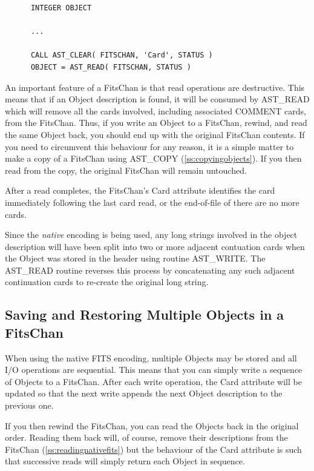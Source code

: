 \documentclass[twoside,11pt]{article}
\newcommand{\htmlref}[2]{#1}
\newcommand{\secref}[1]{\S\ref{#1}}
\renewcommand{\secref}[1]{\ref{#1}}
\begin{document}
\small
\begin{verbatim}
      INTEGER OBJECT

      ...

      CALL AST_CLEAR( FITSCHAN, 'Card', STATUS )
      OBJECT = AST_READ( FITSCHAN, STATUS )
\end{verbatim}
\normalsize

An important feature of a FitsChan is that read operations are
destructive. This means that if an Object description is found, it
will be consumed by AST\_READ which will remove all the cards
involved, including associated COMMENT cards, from the FitsChan. Thus,
if you write an Object to a FitsChan, rewind, and read the same Object
back, you should end up with the original FitsChan contents.  If you
need to circumvent this behaviour for any reason, it is a simple
matter to make a copy of a FitsChan using \htmlref{AST\_COPY}{AST_COPY}
(\secref{ss:copyingobjects}). If you then read from the copy, the
original FitsChan will remain untouched.

After a read completes, the FitsChan's \htmlref{Card}{Card} attribute identifies the
card immediately following the last card read, or the end-of-file of
there are no more cards.


Since the {\em native} encoding is being used, any long strings involved
in the object description will have been split into two or more adjacent
contuation cards when the Object was stored in the header using routine
\htmlref{AST\_WRITE}{AST_WRITE}. The AST\_READ routine reverses this process by concatenating
any such adjacent continuation cards to re-create the original long
string.

\subsection{Saving and Restoring Multiple Objects in a FitsChan}

When using the native FITS encoding, multiple Objects may be stored
and all I/O operations are sequential.  This means that you can simply
write a sequence of Objects to a \htmlref{FitsChan}{FitsChan}. After each write operation,
the \htmlref{Card}{Card} attribute will be updated so that the next write appends the
next \htmlref{Object}{Object} description to the previous one.

If you then rewind the FitsChan, you can read the Objects back in the
original order. Reading them back will, of course, remove their
descriptions from the FitsChan (\secref{ss:readingnativefits}) but the
behaviour of the Card attribute is such that successive reads will
simply return each Object in sequence.
\end{document}
